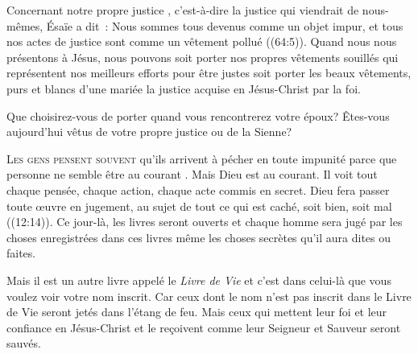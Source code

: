 
Concernant notre \og propre justice \fg{}, c'est-à-dire la justice
 qui viendrait de nous-mêmes, Ésaïe a dit~: 
 \og Nous sommes tous devenus comme un objet impur,
 et tous nos actes de justice sont comme un vêtement pollué \fg{}
 ((64:5)). Quand nous nous présentons à Jésus,
 nous pouvons soit porter nos propres vêtements souillés
 \ocadr qui représentent nos meilleurs efforts pour être justes \fcadr{}
 soit porter les beaux vêtements, purs et blancs d'une mariée
 \ocadr la justice acquise en Jésus-Christ par la foi. 

Que choisirez-vous de porter quand vous rencontrerez votre époux?
 Êtes-vous aujourd'hui vêtus de votre propre justice ou de la Sienne? 

\dvrule






\lettrine{L}{es gens pensent souvent} qu'ils arrivent à pécher
 en toute impunité parce que personne ne semble être au courant
 .
 Mais Dieu est au courant. Il voit tout \ocadr chaque pensée,
 chaque action, chaque acte commis en secret.
 \og Dieu fera passer toute œuvre en jugement,
 au sujet de tout ce qui est caché, soit bien, soit mal \fg{}
 ((12:14)).
 Ce jour-là, les livres seront ouverts et chaque homme
 sera jugé par les choses enregistrées dans ces livres
 \ocadr même les choses secrètes qu'il aura dites ou faites. 

Mais il est un autre livre appelé le \emph{Livre de Vie}
 et c'est dans celui-là que vous voulez voir votre nom inscrit.
 Car ceux dont le nom n'est pas inscrit dans le Livre de Vie
 seront jetés dans l'étang de feu.
 Mais ceux qui mettent leur foi et leur confiance en Jésus-Christ
 et le reçoivent comme leur Seigneur et Sauveur seront sauvés. 

